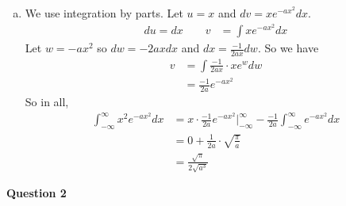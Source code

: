 \documentclass[12pt, letterpaper]{article}
\begin{document}
\begin{enumerate}[(a)]
\begin{align*}
        &= e^{\frac {b^2}{a}} \sqrt{\frac{\pi}{a}}
    \end{align*}
    \item We use integration by parts. Let $u = x$ and $dv = xe^{-ax^2}dx$. 
    \begin{align*}
        du = dx \qquad  v &= \int xe^{-ax^2}dx
    \end{align*}
    Let $w = -ax^2$ so $dw = -2axdx$ and $dx = \frac{-1}{2ax}dw$. So we have
    \begin{align*}
        v &= \int \frac{-1}{2ax}\cdot xe^wdw \\
        &= \frac{-1}{2a}e^{-ax^2}
    \end{align*}
    So in all,
    \begin{align*}
        \int_{-\infty}^{\infty} x^2e^{-ax^2}dx &= x\cdot \frac{-1}{2a}e^{-ax^2}\Big|^\infty_{-\infty} - \frac{-1}{2a}\int_{-\infty}^{\infty} e^{-ax^2}dx \\
        &= 0 + \frac{1}{2a}\cdot \sqrt{\frac{\pi}{a}} \\
        &= \frac{\sqrt \pi}{2\sqrt{a^3}}
    \end{align*}
\end{enumerate}
\newpage
\noindent \textbf{Question 2}
\end{document}
